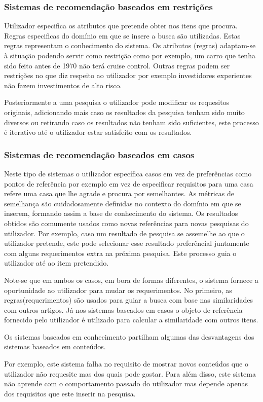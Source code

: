 \subsubsection{Sistemas de recomendação baseados em restrições}
\hfill
 \par Utilizador especifica os atributos que pretende obter nos itens que procura. Regras especificas do domínio em que se insere a busca são utilizadas. Estas regras representam o conhecimento do sistema. Os atributos (regras) adaptam-se à situação podendo servir como restrição como por exemplo, um carro que tenha sido feito  antes de 1970 não terá cruise control. Outras regras podem ser restrições no que diz respeito ao utilizador por exemplo investidores experientes não fazem investimentos de alto risco. 
 \par Posteriormente a uma pesquisa o utilizador pode modificar os requesitos originais, adicionando mais caso os resultados da pesquisa tenham sido muito diversos ou retirando caso os resultados não tenham sido suficientes, este processo é iterativo até o utilizador estar satisfeito com os resultados.  

\hfill
\subsubsection{Sistemas de recomendação baseados em casos}
\hfill
\par Neste tipo de sistemas o utilizador específica casos  em vez de preferências como pontos de referência por exemplo em vez de especificar requisitos para uma casa refere uma casa que lhe agrade e procura por semelhantes. As métricas de semelhança são cuidadosamente definidas no contexto do domínio em que se inserem, formando assim a base de conhecimento do sistema. Os resultados obtidos são comumente usados como novas referências para novas pesquisas do utilizador.  Por exemplo, caso um resultado de pesquisa se assemelhe ao que o utilizador pretende, este pode selecionar esse resultado preferêncial juntamente com alguns requerimentos extra na próxima pesquisa. Este processo guia o utilizador até ao item pretendido.
\par Note-se que em ambos os casos, em bora de formas diferentes, o sistema fornece a oportunidade ao utilizador para mudar os requerimentos.
No primeiro, as regras(requerimentos) são usados para guiar a busca com base nas similaridades com outros artigos. Já nos sistemas baseados em casos o objeto de referência fornecido pelo utilizador é utilizado para calcular a similaridade com outros itens.
\par Os sistemas baseados em conhecimento partilham algumas das desvantagens dos sistemas baseados em conteúdos. 
\par Por exemplo, este sistema falha no requisito de mostrar novos conteúdos que o utilizador não requesite mas dos quais pode gostar.
Para além disso, este sistema não aprende com o comportamento passado do utilizador mas depende apenas dos requisitos que este inserir na pesquisa.


